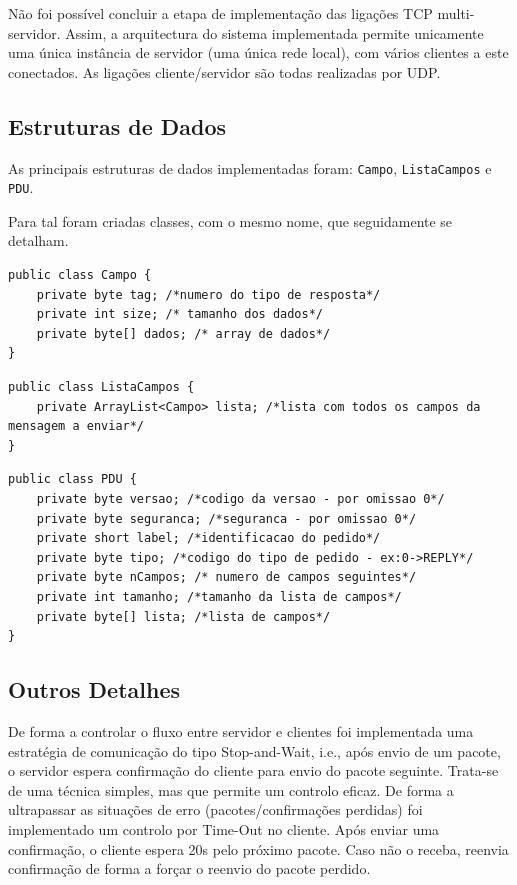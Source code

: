 \documentclass{llncs}
\begin{document}
Não foi possível concluir a etapa de implementação das ligações TCP multi-servidor. 
Assim, a arquitectura do sistema implementada permite unicamente uma única instância de 
servidor (uma única rede local), com vários clientes a este conectados. As ligações 
cliente/servidor são todas realizadas por UDP.

\subsection{Estruturas de Dados}
As principais estruturas de dados implementadas foram: \verb!Campo!, \verb!ListaCampos! e
\verb!PDU!.

Para tal foram criadas classes, com o mesmo nome, que seguidamente se detalham.

\begin{lstlisting}[caption={Classe Campo}, label={code:campo}]
public class Campo {
    private byte tag; /*numero do tipo de resposta*/ 
    private int size; /* tamanho dos dados*/
    private byte[] dados; /* array de dados*/
}
\end{lstlisting}

\begin{lstlisting}[caption={Classe ListaCampos}, label={code:ListaCampos}]
public class ListaCampos {
    private ArrayList<Campo> lista; /*lista com todos os campos da mensagem a enviar*/
}
\end{lstlisting}

\begin{lstlisting}[caption={Classe PDU}, label={code:PDU}]
public class PDU {
    private byte versao; /*codigo da versao - por omissao 0*/
    private byte seguranca; /*seguranca - por omissao 0*/
    private short label; /*identificacao do pedido*/
    private byte tipo; /*codigo do tipo de pedido - ex:0->REPLY*/
    private byte nCampos; /* numero de campos seguintes*/
    private int tamanho; /*tamanho da lista de campos*/
    private byte[] lista; /*lista de campos*/
}
\end{lstlisting}


\subsection{Outros Detalhes}
De forma a controlar o fluxo entre servidor e clientes foi implementada uma 
estratégia de comunicação do tipo Stop-and-Wait, i.e., após envio de um pacote, 
o servidor espera confirmação do cliente para envio do pacote seguinte. Trata-se 
de uma técnica simples, mas que permite um controlo eficaz. De forma a ultrapassar 
as situações de erro (pacotes/confirmações perdidas) foi implementado um controlo 
por Time-Out no cliente. Após enviar uma confirmação, o cliente espera 20s pelo 
próximo pacote. Caso não o receba, reenvia confirmação de forma a forçar o reenvio 
do pacote perdido.\\
\end{document}

